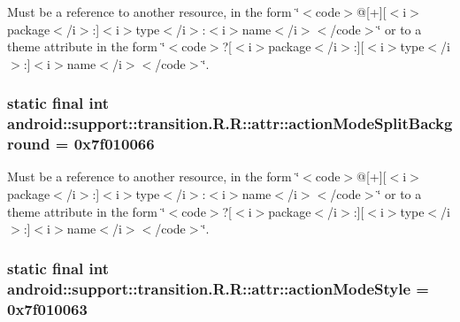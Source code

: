 Must be a reference to another resource, in the form \char`\"{}$<$code$>$@\mbox{[}+\mbox{]}\mbox{[}$<$i$>$package$<$/i$>$:\mbox{]}$<$i$>$type$<$/i$>$:$<$i$>$name$<$/i$>$$<$/code$>$\char`\"{} or to a theme attribute in the form \char`\"{}$<$code$>$?\mbox{[}$<$i$>$package$<$/i$>$:\mbox{]}\mbox{[}$<$i$>$type$<$/i$>$:\mbox{]}$<$i$>$name$<$/i$>$$<$/code$>$\char`\"{}. \hypertarget{classandroid_1_1support_1_1transition_1_1_r_1_1attr_7e035993a5831b1f274551090afd8345}{
\subsubsection[{actionModeSplitBackground}]{\setlength{\rightskip}{0pt plus 5cm}static final int android::support::transition.R.R::attr::actionModeSplitBackground = 0x7f010066}}
\label{classandroid_1_1support_1_1transition_1_1_r_1_1attr_7e035993a5831b1f274551090afd8345}


Must be a reference to another resource, in the form \char`\"{}$<$code$>$@\mbox{[}+\mbox{]}\mbox{[}$<$i$>$package$<$/i$>$:\mbox{]}$<$i$>$type$<$/i$>$:$<$i$>$name$<$/i$>$$<$/code$>$\char`\"{} or to a theme attribute in the form \char`\"{}$<$code$>$?\mbox{[}$<$i$>$package$<$/i$>$:\mbox{]}\mbox{[}$<$i$>$type$<$/i$>$:\mbox{]}$<$i$>$name$<$/i$>$$<$/code$>$\char`\"{}. \hypertarget{classandroid_1_1support_1_1transition_1_1_r_1_1attr_31dae4d5c8487185b2423aed671f1b76}{
\subsubsection[{actionModeStyle}]{\setlength{\rightskip}{0pt plus 5cm}static final int android::support::transition.R.R::attr::actionModeStyle = 0x7f010063}}
\label{classandroid_1_1support_1_1transition_1_1_r_1_1attr_31dae4d5c8487185b2423aed671f1b76}


